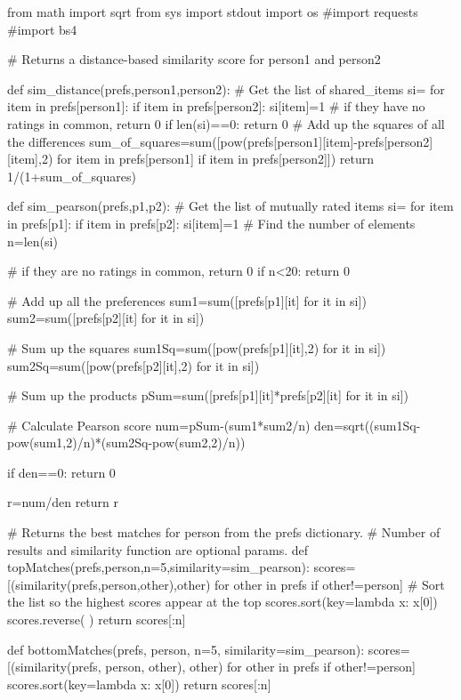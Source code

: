 \documentclass[12pt, letterpaper]{article}
\begin{document}
\begin{MyPython}[caption= Recommendations.py, label=lst:Recommendationspy]
from math import sqrt
from sys import stdout
import os
#import requests
#import bs4

# Returns a distance-based similarity score for person1 and person2


def sim_distance(prefs,person1,person2):
    # Get the list of shared_items
    si={}
    for item in prefs[person1]:
        if item in prefs[person2]:
            si[item]=1
            # if they have no ratings in common, return 0
            if len(si)==0:
                return 0
            # Add up the squares of all the differences
            sum_of_squares=sum([pow(prefs[person1][item]-prefs[person2][item],2)
                                for item in prefs[person1] if item in prefs[person2]])
            return 1/(1+sum_of_squares)

def sim_pearson(prefs,p1,p2):
    # Get the list of mutually rated items
    si={}
    for item in prefs[p1]:
        if item in prefs[p2]:
            si[item]=1
    # Find the number of elements
    n=len(si)

    # if they are no ratings in common, return 0
    if n<20: return 0
        
    # Add up all the preferences
    sum1=sum([prefs[p1][it] for it in si])
    sum2=sum([prefs[p2][it] for it in si])
        
    # Sum up the squares
    sum1Sq=sum([pow(prefs[p1][it],2) for it in si])
    sum2Sq=sum([pow(prefs[p2][it],2) for it in si])
        
    # Sum up the products
    pSum=sum([prefs[p1][it]*prefs[p2][it] for it in si])
        
    # Calculate Pearson score
    num=pSum-(sum1*sum2/n)
    den=sqrt((sum1Sq-pow(sum1,2)/n)*(sum2Sq-pow(sum2,2)/n))
        
    if den==0: return 0
        
    r=num/den
    return r

# Returns the best matches for person from the prefs dictionary.
# Number of results and similarity function are optional params.
def topMatches(prefs,person,n=5,similarity=sim_pearson):
    scores=[(similarity(prefs,person,other),other)
            for other in prefs if other!=person]
    # Sort the list so the highest scores appear at the top
    scores.sort(key=lambda x: x[0])
    scores.reverse( )
    return scores[:n]

def bottomMatches(prefs, person, n=5, similarity=sim_pearson):
    scores=[(similarity(prefs, person, other), other)
            for other in prefs if other!=person]
    scores.sort(key=lambda x: x[0])
    return scores[:n]



\end{MyPython}
\end{document}
